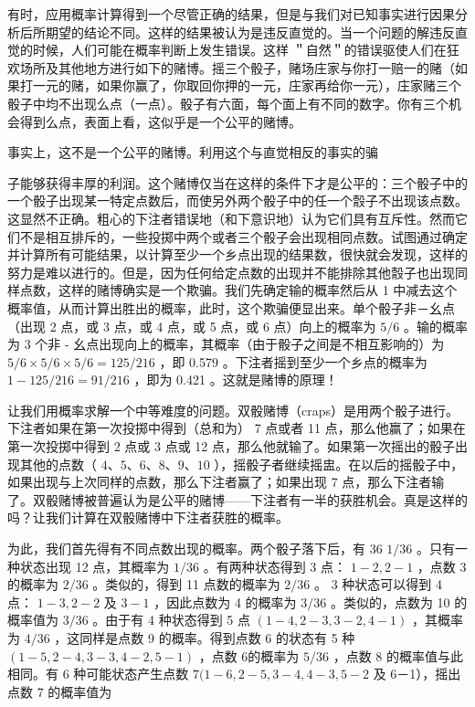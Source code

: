 有时，应用概率计算得到一个尽管正确的结果，但是与我们对已知事实进行因果分析后所期望的结论不同。这样的结果被认为是违反直觉的。当一个问题的解违反直觉的时候，人们可能在概率判断上发生错误。这样 ＂自然＂的错误驱使人们在狂欢场所及其他地方进行如下的赌博。摇三个骰子，赌场庄家与你打一赔一的赌（如果打一元的赌，如果你赢了，你取回你押的一元，庄家再给你一元），庄家赌三个骰子中均不出现么点（一点）。骰子有六面，每个面上有不同的数字。你有三个机会得到么点，表面上看，这似乎是一个公平的赌博。

事实上，这不是一个公平的赌博。利用这个与直觉相反的事实的骗

子能够获得丰厚的利润。这个赌博仅当在这样的条件下才是公平的：三个骰子中的一个骰子出现某一特定点数后，而使另外两个骰子中的任一个䐨子不出现该点数。这显然不正确。粗心的下注者错误地（和下意识地）认为它们具有互斥性。然而它们不是相互排斥的，一些投掷中两个或者三个骰子会出现相同点数。试图通过确定并计算所有可能结果，以计算至少一个乡点出现的结果数，很快就会发现，这样的努力是难以进行的。但是，因为任何给定点数的出现并不能排除其他䐨子也出现同样点数，这样的赌博确实是一个欺骗。我们先确定输的概率然后从 1 中减去这个概率值，从而计算出胜出的概率，此时，这个欺骗便显出来。单个骰子非－幺点（出现 2 点，或 3 点，或 4 点，或 5 点，或 6 点）向上的概率为 $5 / 6$ 。输的概率为 3 个非 - 幺点出现向上的概率，其概率（由于骰子之间是不相互影响的）为 $5 / 6 \times 5 / 6 \times 5 / 6=125 / 216$ ，即 0.579 。下注者摇到至少一个乡点的概率为 $1-125 / 216=91 / 216$ ，即为 0.421 。这就是赌博的原理！

让我们用概率求解一个中等难度的问题。双骰赌博（craps）是用两个骰子进行。下注者如果在第一次投掷中得到（总和为） 7 点或者 11 点，那么他赢了；如果在第一次投掷中得到 2 点或 3 点或 12 点，那么他就输了。如果第一次摇出的骰子出现其他的点数（ $4 、 5 、 6 、 8 、 9 、 10$ ），摇骰子者继续摇盅。在以后的摇骰子中，如果出现与上次同样的点数，那么下注者赢了；如果出现 7 点，那么下注者输了。双骰赌博被普遍认为是公平的赌博——下注者有一半的获胜机会。真是这样的吗？让我们计算在双骰赌博中下注者获胜的概率。

为此，我们首先得有不同点数出现的概率。两个骰子落下后，有 36 $1 / 36$ 。只有一种状态出现 12 点，其概率为 $1 / 36$ 。有两种状态得到 3 点： $1-2,2-1$ ，点数 3 的概率为 $2 / 36$ 。类似的，得到 11 点数的概率为 $2 / 36$ 。 3 种状态可以得到 4 点： $1-3,2-2$ 及 $3-1$ ，因此点数为 4 的概率为 $3 / 36$ 。类似的，点数为 10 的概率值为 $3 / 36$ 。由于有 4 种状态得到 5 点 $(1-4,2-3,3-2,4-1)$ ，其概率为 $4 / 36$ ，这同样是点数 9 的概率。得到点数 6 的状态有 5 种 $(1-5,2-4,3-3,4-2,5-1)$ ，点数 6的概率为 $5 / 36$ ，点数 8 的概率值与此相同。有 6 种可能状态产生点数 $7(1-6,2-5,3-4,4-3,5-2$ 及 6－1），摇出点数 7 的概率值为

